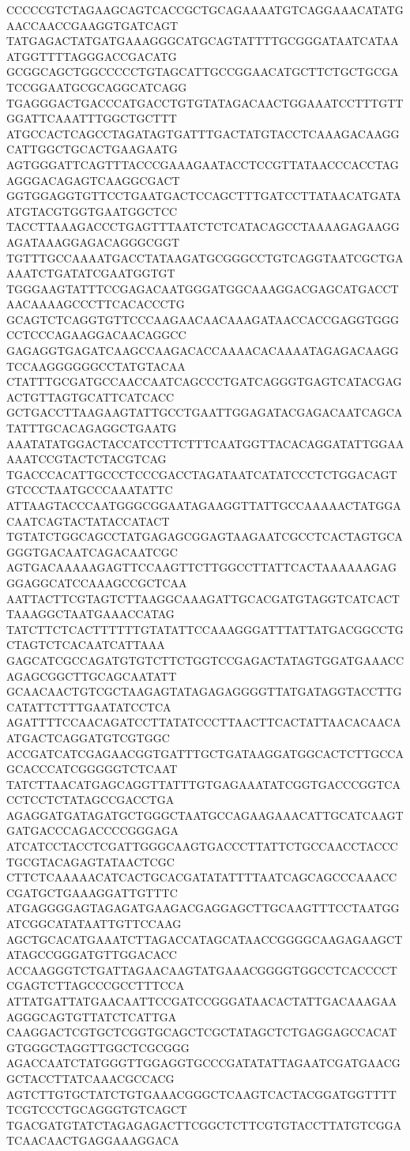 CCCCCGTCTAGAAGCAGTCACCGCTGCAGAAAATGTCAGGAAACATATGAACCAACCGAAGGTGATCAGT
TATGAGACTATGATGAAAGGGCATGCAGTATTTTGCGGGATAATCATAAATGGTTTTAGGGACCGACATG
GCGGCAGCTGGCCCCCTGTAGCATTGCCGGAACATGCTTCTGCTGCGATCCGGAATGCGCAGGCATCAGG
TGAGGGACTGACCCATGACCTGTGTATAGACAACTGGAAATCCTTTGTTGGATTCAAATTTGGCTGCTTT
ATGCCACTCAGCCTAGATAGTGATTTGACTATGTACCTCAAAGACAAGGCATTGGCTGCACTGAAGAATG
AGTGGGATTCAGTTTACCCGAAAGAATACCTCCGTTATAACCCACCTAGAGGGACAGAGTCAAGGCGACT
GGTGGAGGTGTTCCTGAATGACTCCAGCTTTGATCCTTATAACATGATAATGTACGTGGTGAATGGCTCC
TACCTTAAAGACCCTGAGTTTAATCTCTCATACAGCCTAAAAGAGAAGGAGATAAAGGAGACAGGGCGGT
TGTTTGCCAAAATGACCTATAAGATGCGGGCCTGTCAGGTAATCGCTGAAAATCTGATATCGAATGGTGT
TGGGAAGTATTTCCGAGACAATGGGATGGCAAAGGACGAGCATGACCTAACAAAAGCCCTTCACACCCTG
GCAGTCTCAGGTGTTCCCAAGAACAACAAAGATAACCACCGAGGTGGGCCTCCCAGAAGGACAACAGGCC
GAGAGGTGAGATCAAGCCAAGACACCAAAACACAAAATAGAGACAAGGTCCAAGGGGGGCCTATGTACAA
CTATTTGCGATGCCAACCAATCAGCCCTGATCAGGGTGAGTCATACGAGACTGTTAGTGCATTCATCACC
GCTGACCTTAAGAAGTATTGCCTGAATTGGAGATACGAGACAATCAGCATATTTGCACAGAGGCTGAATG
AAATATATGGACTACCATCCTTCTTTCAATGGTTACACAGGATATTGGAAAAATCCGTACTCTACGTCAG
TGACCCACATTGCCCTCCCGACCTAGATAATCATATCCCTCTGGACAGTGTCCCTAATGCCCAAATATTC
ATTAAGTACCCAATGGGCGGAATAGAAGGTTATTGCCAAAAACTATGGACAATCAGTACTATACCATACT
TGTATCTGGCAGCCTATGAGAGCGGAGTAAGAATCGCCTCACTAGTGCAGGGTGACAATCAGACAATCGC
AGTGACAAAAAGAGTTCCAAGTTCTTGGCCTTATTCACTAAAAAAGAGGGAGGCATCCAAAGCCGCTCAA
AATTACTTCGTAGTCTTAAGGCAAAGATTGCACGATGTAGGTCATCACTTAAAGGCTAATGAAACCATAG
TATCTTCTCACTTTTTTGTATATTCCAAAGGGATTTATTATGACGGCCTGCTAGTCTCACAATCATTAAA
GAGCATCGCCAGATGTGTCTTCTGGTCCGAGACTATAGTGGATGAAACCAGAGCGGCTTGCAGCAATATT
GCAACAACTGTCGCTAAGAGTATAGAGAGGGGTTATGATAGGTACCTTGCATATTCTTTGAATATCCTCA
AGATTTTCCAACAGATCCTTATATCCCTTAACTTCACTATTAACACAACAATGACTCAGGATGTCGTGGC
ACCGATCATCGAGAACGGTGATTTGCTGATAAGGATGGCACTCTTGCCAGCACCCATCGGGGGTCTCAAT
TATCTTAACATGAGCAGGTTATTTGTGAGAAATATCGGTGACCCGGTCACCTCCTCTATAGCCGACCTGA
AGAGGATGATAGATGCTGGGCTAATGCCAGAAGAAACATTGCATCAAGTGATGACCCAGACCCCGGGAGA
ATCATCCTACCTCGATTGGGCAAGTGACCCTTATTCTGCCAACCTACCCTGCGTACAGAGTATAACTCGC
CTTCTCAAAAACATCACTGCACGATATATTTTAATCAGCAGCCCAAACCCGATGCTGAAAGGATTGTTTC
ATGAGGGGAGTAGAGATGAAGACGAGGAGCTTGCAAGTTTCCTAATGGATCGGCATATAATTGTTCCAAG
AGCTGCACATGAAATCTTAGACCATAGCATAACCGGGGCAAGAGAAGCTATAGCCGGGATGTTGGACACC
ACCAAGGGTCTGATTAGAACAAGTATGAAACGGGGTGGCCTCACCCCTCGAGTCTTAGCCCGCCTTTCCA
ATTATGATTATGAACAATTCCGATCCGGGATAACACTATTGACAAAGAAAGGGCAGTGTTATCTCATTGA
CAAGGACTCGTGCTCGGTGCAGCTCGCTATAGCTCTGAGGAGCCACATGTGGGCTAGGTTGGCTCGCGGG
AGACCAATCTATGGGTTGGAGGTGCCCGATATATTAGAATCGATGAACGGCTACCTTATCAAACGCCACG
AGTCTTGTGCTATCTGTGAAACGGGCTCAAGTCACTACGGATGGTTTTTCGTCCCTGCAGGGTGTCAGCT
TGACGATGTATCTAGAGAGACTTCGGCTCTTCGTGTACCTTATGTCGGATCAACAACTGAGGAAAGGACA
